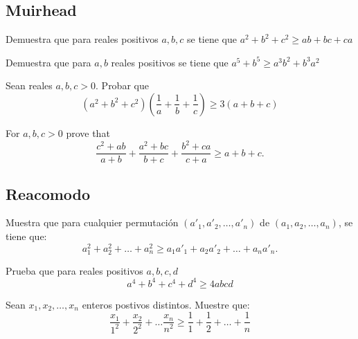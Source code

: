 \documentclass[11pt]{scrartcl}
\begin{document}
\subsection{Muirhead}
\begin{problem}
    Demuestra que para reales positivos $a,b,c$ se tiene que $a^2+b^2+c^2 \geq ab+bc+ca$ 
\end{problem}
\begin{problem}
    Demuestra que para $a,b$ reales positivos se tiene que 
    $a^5+b^5 \geq a^3b^2+b^3a^2$
    
\end{problem}

\begin{problem}
Sean reales $a,b,c>0$. Probar que 
\[ \left(a^2+b^2+c^2\right)\left(\frac1a+\frac1b+\frac1c\right) \geq 3(a+b+c)\]
\end{problem}

\begin{problem}
      For $a,b,c > 0$ prove that
  \[
  \frac{c^2+ab}{a+b}
  + \frac{a^2+bc}{b+c}
  + \frac{b^2+ca}{c+a}
  \ge a+b+c.
  \]
\end{problem}



\subsection{Reacomodo}

\begin{problem}
Muestra que para cualquier permutaci\'on $\left(a'_1, a'_2, \dots, a'_n\right)$ de $\left(a_1, a_2, \dots, a_n\right)$, se tiene que:
\begin{equation*}
    a^2_1 + a^2_2 + \dots + a^2_n \geq a_1a'_1 + a_2a'_2 + \dots + a_na'_n.
\end{equation*}
\end{problem}


\begin{problem}
    Prueba que para reales positivos $a,b,c,d$
    \[a^4+b^4+c^4+d^4\geq 4abcd\]
\end{problem}

\begin{problem} [IMO 1978/5]
Sean $x_1, x_2, \dots, x_n$ enteros postivos distintos. Muestre que:
\begin{equation*}
    \frac{x_1}{1^2} + \frac{x_2}{2^2} + \dots \frac{x_n}{n^2} \geq \frac{1}{1} + \frac{1}{2} + \dots + \frac{1}{n}
\end{equation*}
\end{problem}
\end{document}
